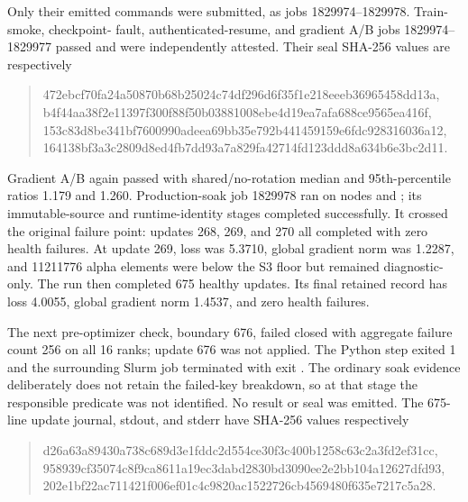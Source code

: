 \documentclass[11pt]{article}
\let\pathcode\path
\begin{document}
Only their emitted commands were submitted, as jobs 1829974--1829978.  Train-smoke, checkpoint-
fault, authenticated-resume, and gradient A/B jobs 1829974--1829977 passed and were independently
attested.  Their seal SHA-256 values are respectively
\begin{quote}
{\ttfamily\scriptsize 472ebcf70fa24a50870b68b25024c74df296d6f35f1e218eeeb36965458dd13a},\\
{\ttfamily\scriptsize b4f44aa38f2e11397f300f88f50b03881008ebe4d19ea7afa688ce9565ea416f},\\
{\ttfamily\scriptsize 153c83d8be341bf7600990adeea69bb35e792b441459159e6fdc928316036a12},\\
{\ttfamily\scriptsize 164138bf3a3c2809d8ed4fb7dd93a7a829fa42714fd123ddd8a634b6e3bc2d11}.
\end{quote}
Gradient A/B again passed with shared/no-rotation median and 95th-percentile ratios 1.179 and 1.260.
Production-soak job 1829978 ran on nodes \pathcode{h200-207-042} and
\pathcode{h200-211-043}; its immutable-source and runtime-identity stages completed successfully.
It crossed the original failure point: updates 268, 269, and 270 all completed with zero health
failures.  At update 269, loss was 5.3710, global gradient norm was 1.2287, and 11211776 alpha
elements were below the S3 floor but remained diagnostic-only.  The run then completed 675 healthy
updates.  Its final retained record has loss 4.0055, global gradient norm 1.4537, and zero health
failures.

The next pre-optimizer check, boundary 676, failed closed with aggregate failure count 256 on all
16 ranks; update 676 was not applied.  The Python step exited 1 and the surrounding Slurm job
terminated with exit \pathcode{15:0}.  The ordinary soak evidence deliberately does not retain the
failed-key breakdown, so at that stage the responsible predicate was not identified.  No result or seal was
emitted.  The 675-line update journal, stdout, and stderr have SHA-256 values respectively
\begin{quote}
{\ttfamily\scriptsize d26a63a89430a738c689d3e1fddc2d554ce30f3c400b1258c63c2a3fd2ef31cc},\\
{\ttfamily\scriptsize 958939cf35074c8f9ca8611a19ec3dabd2830bd3090ee2e2bb104a12627dfd93},\\
{\ttfamily\scriptsize 202e1bf22ac711421f006ef01c4c9820ac1522726cb4569480f635e7217c5a28}.
\end{quote}
\end{document}
